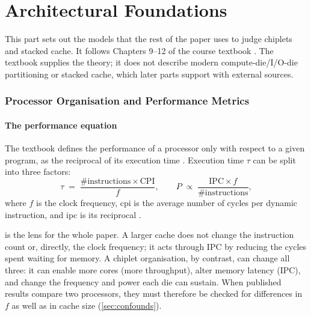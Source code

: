 \clearpage
\part{Architectural Foundations}
\label{part:foundations}

This part sets out the models that the rest of the paper uses to judge chiplets and stacked cache. It follows Chapters 9--12 of the course textbook \cite{sarangi2025basic}. The textbook supplies the theory; it does not describe modern compute-die/I/O-die partitioning or stacked cache, which later parts support with external sources.

\section{Processor Organisation and Performance Metrics}
\label{sec:perf-metrics}

\subsection{The performance equation}

The textbook defines the performance of a processor only with respect to a given program, as the reciprocal of its execution time \cite[sec.~10.9.1]{sarangi2025basic}. Execution time $\tau$ can be split into three factors:
\begin{equation}
  \tau \;=\; \frac{\#\text{instructions} \times \mathrm{CPI}}{f},
  \qquad
  P \;\propto\; \frac{\mathrm{IPC} \times f}{\#\text{instructions}},
  \label{eq:perf}
\end{equation}
where $f$ is the clock frequency, \gls{cpi} is the average number of cycles per dynamic instruction, and \gls{ipc} is its reciprocal \cite[sec.~10.9.1]{sarangi2025basic}.

 is the lens for the whole paper. A larger cache does not change the instruction count or, directly, the clock frequency; it acts through IPC by reducing the cycles spent waiting for memory. A chiplet organisation, by contrast, can change all three: it can enable more cores (more throughput), alter memory latency (IPC), and change the frequency and power each die can sustain. When published results compare two processors, they must therefore be checked for differences in $f$ as well as in cache size (\cref{sec:confounds}).

